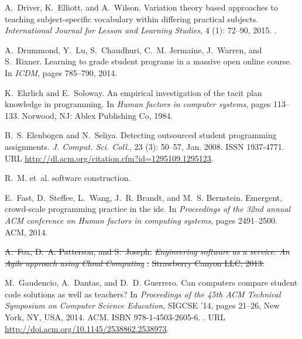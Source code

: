 \documentclass[12pt,twoside]{mitthesis}
\providecommand{\DIFdeltex}[1]{{\protect\color{red}\sout{#1}}}                      %
\providecommand{\DIFdelbegin}{} %
\providecommand{\DIFdelend}{} %
\providecommand{\DIFdel}[1]{\texorpdfstring{\DIFdeltex{#1}}{}} %
\begin{document}
{{{{{{{{{{\begin{thebibliography}{135}
\DIFdelend {}
A.~Driver, K.~Elliott, and A.~Wilson.
\newblock Variation theory based approaches to teaching subject-specific
  vocabulary within differing practical subjects.
\newblock \emph{International Journal for Lesson and Learning Studies},
  4 (1): 72--90, 2015.
\newblock {}.

A.~Drummond, Y.~Lu, S.~Chaudhuri, C.~M. Jermaine, J.~Warren, and S.~Rixner.
\newblock Learning to grade student programs in a massive open online course.
\newblock In \emph{ICDM}, pages 785--790, 2014.

K.~Ehrlich and E.~Soloway.
\newblock An empirical investigation of the tacit plan knowledge in
  programming.
\newblock In \emph{Human factors in computer systems}, pages 113--133. Norwood,
  NJ: Ablex Publishing Co, 1984.

B.~S. Elenbogen and N.~Seliya.
\newblock Detecting outsourced student programming assignments.
\newblock \emph{J. Comput. Sci. Coll.}, 23 (3): 50--57, Jan.
  2008.
\newblock ISSN 1937-4771.
\newblock URL \url{http://dl.acm.org/citation.cfm?id=1295109.1295123}.

R.~M. et~al.
 software construction.

E.~Fast, D.~Steffee, L.~Wang, J.~R. Brandt, and M.~S. Bernstein.
\newblock Emergent, crowd-scale programming practice in the ide.
\newblock In \emph{Proceedings of the 32nd annual ACM conference on Human
  factors in computing systems}, pages 2491--2500. ACM, 2014.

\DIFdelbegin %
\DIFdel{A.~Fox, D.~A. Patterson, and S.~Joseph.
}%
\emph{\DIFdel{Engineering software as a service: An Agile approach using
  Cloud Computing}}%
\DIFdel{.
}%
\DIFdel{Strawberry Canyon LLC, 2013.
}%

\DIFdelend {}
M.~Gaudencio, A.~Dantas, and D.~D. Guerrero.
\newblock Can computers compare student code solutions as well as teachers?
\newblock In \emph{Proceedings of the 45th ACM Technical Symposium on Computer
  Science Education}, SIGCSE '14, pages 21--26, New York, NY, USA,
  2014{}. ACM.
\newblock ISBN 978-1-4503-2605-6.
\newblock {}.
\newblock URL \url{http://doi.acm.org/10.1145/2538862.2538973}.


\end{thebibliography}}}}}}}}}}}
\end{document}
